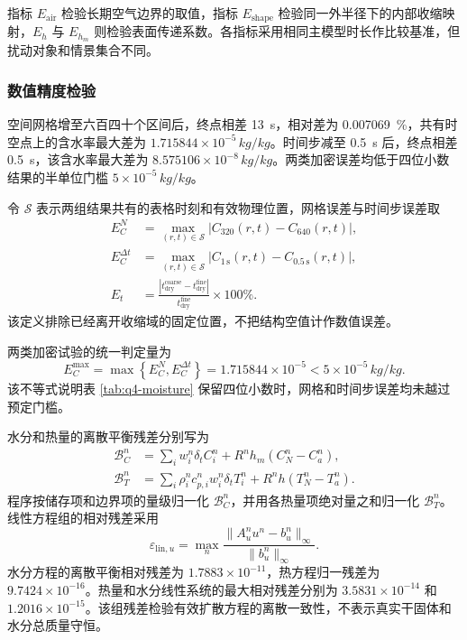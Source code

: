 \documentclass[withoutpreface,bwprint]{cumcmthesis}
\begin{document}
指标 \(E_{\mathrm{air}}\) 检验长期空气边界的取值，指标 \(E_{\mathrm{shape}}\) 检验同一外半径下的内部收缩映射，\(E_h\) 与 \(E_{h_m}\) 则检验表面传递系数。各指标采用相同主模型时长作比较基准，但扰动对象和情景集合不同。

\subsubsection{数值精度检验}

空间网格增至六百四十个区间后，终点相差 \SI{13}{s}，相对差为 \SI{0.007069}{\percent}，共有时空点上的含水率最大差为 \(1.715844\times10^{-5}\,\si{kg/kg}\)。时间步减至 \SI{0.5}{s} 后，终点相差 \SI{0.5}{s}，该含水率最大差为 \(8.575106\times10^{-8}\,\si{kg/kg}\)。两类加密误差均低于四位小数结果的半单位门槛 \(5\times10^{-5}\,\si{kg/kg}\)。

令 \(\mathcal S\) 表示两组结果共有的表格时刻和有效物理位置，网格误差与时间步误差取
\begin{align}
E_C^{N}&=\max_{(r,t)\in\mathcal S}
\left|C_{320}(r,t)-C_{640}(r,t)\right|,\\
E_C^{\Delta t}&=\max_{(r,t)\in\mathcal S}
\left|C_{1\,\mathrm{s}}(r,t)-C_{0.5\,\mathrm{s}}(r,t)\right|,\\
E_t&=\frac{|t_{\mathrm{dry}}^{\mathrm{coarse}}-t_{\mathrm{dry}}^{\mathrm{fine}}|}
{t_{\mathrm{dry}}^{\mathrm{fine}}}\times100\%.
\label{eq:q4-refinement-error}
\end{align}
该定义排除已经离开收缩域的固定位置，不把结构空值计作数值误差。

两类加密试验的统一判定量为
\begin{equation}
E_C^{\max}=\max\left\{E_C^N,E_C^{\Delta t}\right\}
=1.715844\times10^{-5}<5\times10^{-5}\,\si{kg/kg}.
\label{eq:q4-refinement-pass}
\end{equation}
该不等式说明表 \ref{tab:q4-moisture} 保留四位小数时，网格和时间步误差均未越过预定门槛。

水分和热量的离散平衡残差分别写为
\begin{align}
\mathcal B_C^n&=\sum_i w_i^n\delta_t C_i^n
+R^n h_m\left(C_N^n-C_a^n\right),\\
\mathcal B_T^n&=\sum_i \rho_i^n c_{p,i}^n w_i^n\delta_t T_i^n
+R^n h\left(T_N^n-T_a^n\right).
\label{eq:q4-balance-residual}
\end{align}
程序按储存项和边界项的量级归一化 \(\mathcal B_C^n\)，并用各热量项绝对量之和归一化 \(\mathcal B_T^n\)。线性方程组的相对残差采用
\begin{equation}
\varepsilon_{\mathrm{lin},u}=
\max_n\frac{\|A_u^n u^n-b_u^n\|_\infty}{\|b_u^n\|_\infty}.
\label{eq:q4-linear-residual}
\end{equation}
水分方程的离散平衡相对残差为 \(1.7883\times10^{-11}\)，热方程归一残差为 \(9.7424\times10^{-16}\)。热量和水分线性系统的最大相对残差分别为 \(3.5831\times10^{-14}\) 和 \(1.2016\times10^{-15}\)。该组残差检验有效扩散方程的离散一致性，不表示真实干固体和水分总质量守恒。
\end{document}
